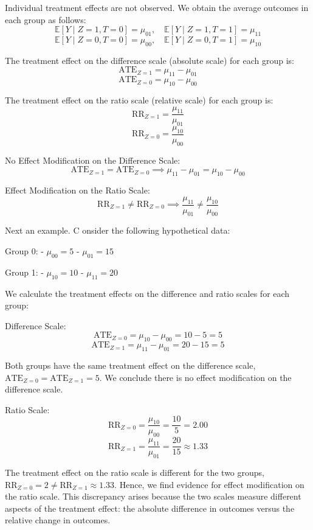 \documentclass[
  single column]{article}
\begin{document}
Individual treatment effects are not observed. We obtain the average
outcomes in each group as follows: \[
\mathbb{E}[Y \mid Z = 1, T = 0] = \mu_{01}, \quad \mathbb{E}[Y \mid Z = 1, T = 1] = \mu_{11}
\] \[
\mathbb{E}[Y \mid Z = 0, T = 0] = \mu_{00}, \quad \mathbb{E}[Y \mid Z = 0, T = 1] = \mu_{10}
\]

The treatment effect on the difference scale (absolute scale) for each
group is: \[
\text{ATE}_{Z = 1} = \mu_{11} - \mu_{01}
\] \[
\text{ATE}_{Z = 0} = \mu_{10} - \mu_{00}
\]

The treatment effect on the ratio scale (relative scale) for each group
is: \[
\text{RR}_{Z = 1} = \frac{\mu_{11}}{\mu_{01}}
\] \[
\text{RR}_{Z = 0} = \frac{\mu_{10}}{\mu_{00}}
\]

No Effect Modification on the Difference Scale: \[
\text{ATE}_{Z = 1} = \text{ATE}_{Z = 0} \implies \mu_{11} - \mu_{01} = \mu_{10} - \mu_{00}
\]

Effect Modification on the Ratio Scale: \[
\text{RR}_{Z = 1} \neq \text{RR}_{Z = 0} \implies \frac{\mu_{11}}{\mu_{01}} \neq \frac{\mu_{10}}{\mu_{00}}
\]

Next an example. C onsider the following hypothetical data:

Group 0: - \(\mu_{00} = 5\) - \(\mu_{01} = 15\)

Group 1: - \(\mu_{10} = 10\) - \(\mu_{11} = 20\)

We calculate the treatment effects on the difference and ratio scales
for each group:

Difference Scale: \[
\text{ATE}_{Z = 0} = \mu_{10} - \mu_{00} = 10 - 5 = 5
\] \[
\text{ATE}_{Z = 1} = \mu_{11} - \mu_{01} = 20 - 15 = 5
\]

Both groups have the same treatment effect on the difference scale,
\(\text{ATE}_{Z = 0} = \text{ATE}_{Z = 1} = 5\). We conclude there is no
effect modification on the difference scale.

Ratio Scale: \[
\text{RR}_{Z = 0} = \frac{\mu_{10}}{\mu_{00}} = \frac{10}{5} = 2.00
\] \[
\text{RR}_{Z = 1} = \frac{\mu_{11}}{\mu_{01}} = \frac{20}{15} \approx 1.33
\]

The treatment effect on the ratio scale is different for the two groups,
\(\text{RR}_{Z = 0} = 2 \neq \text{RR}_{Z = 1} \approx 1.33\). Hence, we
find evidence for effect modification on the ratio scale. This
discrepancy arises because the two scales measure different aspects of
the treatment effect: the absolute difference in outcomes versus the
relative change in outcomes.
\end{document}
